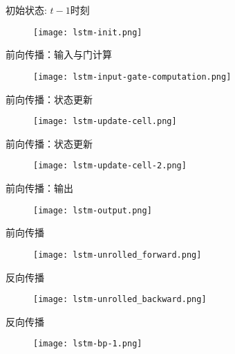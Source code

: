 \begin{frame}[fragile]{初始状态: $t-1$时刻}
  \begin{figure}
    \centering
    \texttt{[image: lstm-init.png]}
  \end{figure}
\end{frame}

\begin{frame}[fragile]{前向传播：输入与门计算}
  \begin{figure}
    \centering
    \texttt{[image: lstm-input-gate-computation.png]}
  \end{figure}
\end{frame}

\begin{frame}[fragile]{前向传播：状态更新}
  \begin{figure}
    \centering
    \texttt{[image: lstm-update-cell.png]}
  \end{figure}
\end{frame}

\begin{frame}[fragile]{前向传播：状态更新}
  \begin{figure}
    \centering
    \texttt{[image: lstm-update-cell-2.png]}
  \end{figure}
\end{frame}

\begin{frame}[fragile]{前向传播：输出}
  \begin{figure}
    \centering
    \texttt{[image: lstm-output.png]}
  \end{figure}
\end{frame}

\begin{frame}[fragile]{前向传播}
  \begin{figure}
    \centering
    \texttt{[image: lstm-unrolled\_forward.png]}
  \end{figure}
\end{frame}

\begin{frame}[fragile]{反向传播}
  \begin{figure}
    \centering
    \texttt{[image: lstm-unrolled\_backward.png]}
  \end{figure}
\end{frame}


\begin{frame}[fragile]{反向传播}
  \begin{figure}
    \centering
    \texttt{[image: lstm-bp-1.png]}
  \end{figure}
\end{frame}


